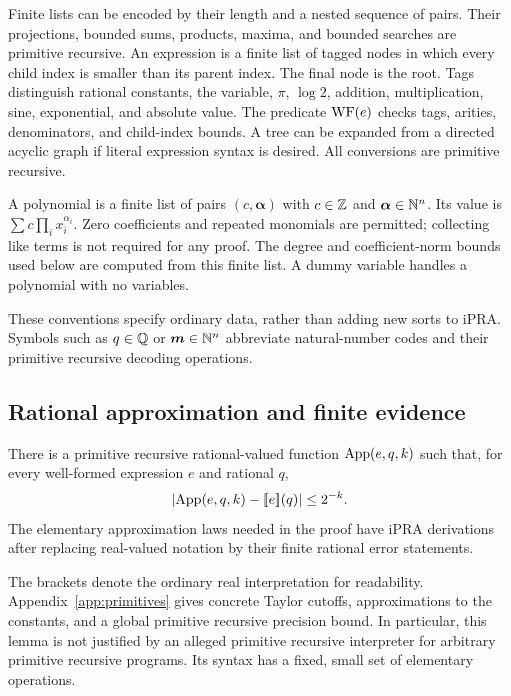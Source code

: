 Finite lists can be encoded by their length and a nested sequence of pairs.
Their projections, bounded sums, products, maxima, and bounded searches are
primitive recursive. An expression is a finite list of tagged nodes in
which every child index is smaller than its parent index. The final node
is the root. Tags distinguish rational constants, the variable, $\pi$,
$\log2$, addition, multiplication, sine, exponential, and absolute value.
The predicate $\operatorname{WF}(e)$ checks tags, arities, denominators, and child-index
bounds. A tree can be expanded from a directed acyclic graph if literal
expression syntax is desired. All conversions are primitive recursive.

A polynomial is a finite list of pairs $(c,\boldsymbol\alpha)$ with
$c\in\mathbb Z$ and $\boldsymbol\alpha\in\mathbb N^n$. Its value is
$\sum c\prod_i x_i^{\alpha_i}$. Zero coefficients and repeated monomials
are permitted; collecting like terms is not required for any proof.
The degree and coefficient-norm bounds used below are computed from this
finite list. A dummy variable handles a polynomial with no variables.

These conventions specify ordinary data, rather than adding new sorts to
iPRA. Symbols such as $q\in\mathbb Q$ or $\boldsymbol m\in\mathbb N^n$ abbreviate
natural-number codes and their primitive recursive decoding operations.

\subsection{Rational approximation and finite evidence}

\begin{lemma}\label{lem:approx}
There is a primitive recursive rational-valued function $\operatorname{App}(e,q,k)$
such that, for every well-formed expression $e$ and rational $q$,
\begin{equation}\label{eq:approx-error}
 \left|\operatorname{App}(e,q,k)-[\![ e]\!](q)\right|\le2^{-k}.
\end{equation}
The elementary approximation laws needed in the proof have iPRA
derivations after replacing real-valued notation by their finite rational
error statements.
\end{lemma}

The brackets denote the ordinary real interpretation for readability.
Appendix~\ref{app:primitives} gives concrete Taylor cutoffs, approximations
to the constants, and a global primitive recursive precision bound.
In particular, this lemma is not justified by an alleged primitive
recursive interpreter for arbitrary primitive recursive programs. Its
syntax has a fixed, small set of elementary operations.

